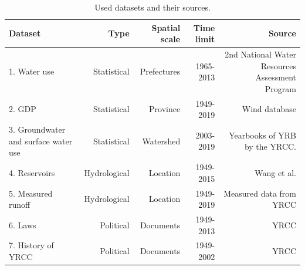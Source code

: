 \documentclass[9pt,twoside,lineno]{pnas-new}
\begin{document}
\begin{table}\centering
    \caption{Used datasets and their sources.}

    \begin{tabular}{lrrrr}
    Dataset & Type & Spatial scale & Time limit & Source \\
    \midrule
    1. Water use & Statistical & Prefectures & 1965-2013 & 2nd National Water Resources Assessment Program \\
    2. GDP & Statistical & Province & 1949-2019 & Wind database \\
    3. Groundwater and surface water use & Statistical & Watershed & 2003-2019 & Yearbooks of YRB by the YRCC. \\
    4. Reservoirs & Hydrological & Location & 1949-2015 & Wang et al. \cite{wangYellowRiverWater2019} \\
    5. Measured runoff & Hydrological & Location & 1949-2019 & Measured data from YRCC \\
    6. Laws & Political & Documents & 1949-2013 & YRCC \cite{yellowriverconservancycommissionYellowRiverBasin2013} \\
    7. History of YRCC & Political & Documents & 1949-2002 & YRCC \cite{ yellowriverarchivesOrganizationalHistoryYellow2004} \\
    \bottomrule
    \end{tabular}
\end{table}

\end{document}

